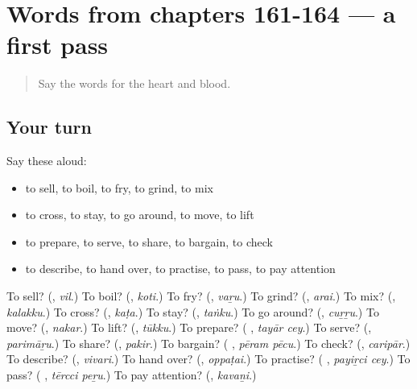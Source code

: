 \section[(dialogue)]{Words from chapters 161-164 — a first pass}

\label{lesson:TA-R169-first-pass-words-from-chapters-161-164}



\begin{quote}
Say the words for the heart and blood.
\end{quote}

\subsection*{Your turn}
Say these aloud:

\begin{itemize}
\raggedright
  \item to sell, to boil, to fry, to grind, to mix
  \item to cross, to stay, to go around, to move, to lift
  \item to prepare, to serve, to share, to bargain, to check
  \item to describe, to hand over, to practise, to pass, to pay attention
\end{itemize}

\begin{tcolorbox}[breakable,colback=teal!4,colframe=teal!35!black,title={Before you move on}]
To sell? (\textbf{}, \emph{vil}.) To boil? (\textbf{}, \emph{koti}.) To fry? (\textbf{}, \emph{vaṟu}.) To grind? (\textbf{}, \emph{arai}.) To mix? (\textbf{}, \emph{kalakku}.) To cross? (\textbf{}, \emph{kaṭa}.) To stay? (\textbf{}, \emph{taṅku}.) To go around? (\textbf{}, \emph{cuṟṟu}.) To move? (\textbf{}, \emph{nakar}.) To lift? (\textbf{}, \emph{tūkku}.) To prepare? (\textbf{ }, \emph{tayār cey}.) To serve? (\textbf{}, \emph{parimāṟu}.) To share? (\textbf{}, \emph{pakir}.) To bargain? (\textbf{ }, \emph{pēram pēcu}.) To check? (\textbf{}, \emph{caripār}.) To describe? (\textbf{}, \emph{vivari}.) To hand over? (\textbf{}, \emph{oppaṭai}.) To practise? (\textbf{ }, \emph{payiṟci cey}.) To pass? (\textbf{ }, \emph{tērcci peṟu}.) To pay attention? (\textbf{}, \emph{kavaṉi}.)
\end{tcolorbox}

